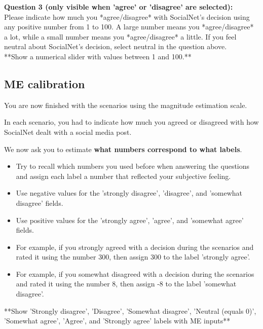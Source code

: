 \documentclass[a4paper]{article}
\begin{document}
\textbf{Question 3 (only visible when 'agree' or 'disagree' are selected):}\\
Please indicate how much you *agree/disagree* with SocialNet's decision using any positive number from 1 to 100. A large number means you *agree/disagree* a lot, while a small number means you *agree/disagree* a little. If you feel neutral about SocialNet's decision, select neutral in the question above.\\

**Show a numerical slider with values between 1 and 100.**\\


\subsection{ME calibration}
You are now finished with the scenarios using the magnitude estimation scale.

In each scenario, you had to indicate how much you agreed or disagreed with how SocialNet dealt with a social media post.

We now ask you to estimate \textbf{what numbers correspond to what labels}.

\begin{itemize}
    \item Try to recall which numbers you used before when answering the questions and assign each label a number that reflected your subjective feeling.
    \item Use negative values for the 'strongly disagree', 'disagree', and 'somewhat disagree' fields.
    \item Use positive values for the 'strongly agree', 'agree', and 'somewhat agree' fields.
    \item For example, if you strongly agreed with a decision during the scenarios and rated it using the number 300, then assign 300 to the label 'strongly agree'.
    \item For example, if you somewhat disagreed with a decision during the scenarios and rated it using the number 8, then assign -8 to the label 'somewhat disagree'.
\end{itemize}

**Show 'Strongly disagree', 'Disagree', 'Somewhat disagree', 'Neutral (equals 0)', 'Somewhat agree', 'Agree', and 'Strongly agree' labels with ME inputs**



\end{document}
